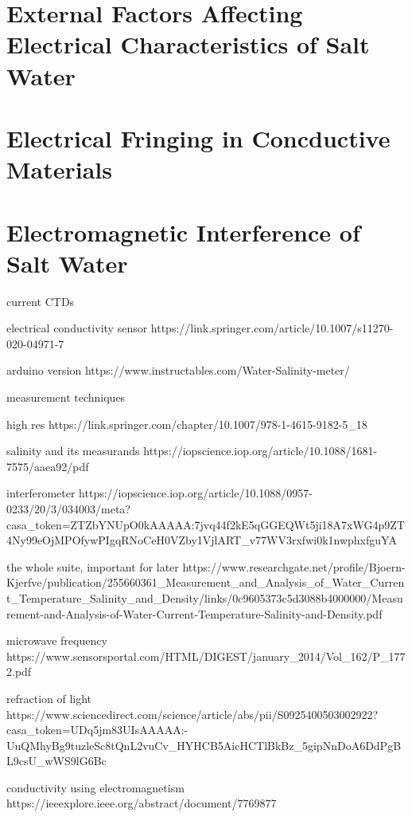 \section{External Factors Affecting Electrical Characteristics of Salt Water} \label{sec:external-factors-affecting-electrical-characteristics-of-salt-water}

\section{Electrical Fringing in Concductive Materials}

\section{Electromagnetic Interference of Salt Water}

current CTDs

electrical conductivity sensor https://link.springer.com/article/10.1007/s11270-020-04971-7

arduino version https://www.instructables.com/Water-Salinity-meter/

measurement techniques

high res https://link.springer.com/chapter/10.1007/978-1-4615-9182-5_18

salinity and its measurands https://iopscience.iop.org/article/10.1088/1681-7575/aaea92/pdf

interferometer https://iopscience.iop.org/article/10.1088/0957-0233/20/3/034003/meta?casa_token=ZTZbYNUpO0kAAAAA:7jvq44f2kE5qGGEQWt5ji18A7xWG4p9ZT4Ny99eOjMPOfywPIgqRNoCeH0VZby1VjlART_v77WV3rxfwi0k1nwphxfguYA

the whole suite, important for later https://www.researchgate.net/profile/Bjoern-Kjerfve/publication/255660361_Measurement_and_Analysis_of_Water_Current_Temperature_Salinity_and_Density/links/0c9605373c5d3088b4000000/Measurement-and-Analysis-of-Water-Current-Temperature-Salinity-and-Density.pdf

microwave frequency https://www.sensorsportal.com/HTML/DIGEST/january_2014/Vol_162/P_1772.pdf

refraction of light https://www.sciencedirect.com/science/article/abs/pii/S0925400503002922?casa_token=UDq5jm83UIsAAAAA:-UuQMhyBg9tuzleSc8tQnL2vuCv_HYHCB5AicHCTlBkBz_5gipNnDoA6DdPgBL9csU_wWS9lG6Bc

conductivity using electromagnetism https://ieeexplore.ieee.org/abstract/document/7769877

